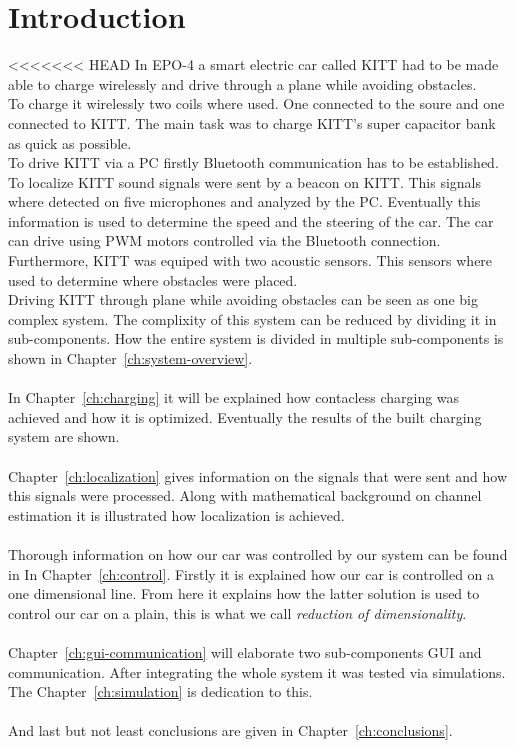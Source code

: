 \documentclass[11pt,titlepage]{report}
\begin{document}
\chapter{Introduction}
<<<<<<< HEAD
In EPO-4 a smart electric car called KITT had to be made able to charge wirelessly and drive through a plane while avoiding obstacles. \\
To charge it wirelessly two coils where used. One connected to the soure and one connected to KITT. The main task was to charge KITT's super capacitor bank as quick as possible. \\
To drive KITT via a PC firstly Bluetooth communication has to be established. To localize KITT sound signals were sent by a beacon on KITT. This signals where detected on five microphones and analyzed by the PC. Eventually this information is used to determine the speed and the steering of the car. The car can drive using PWM motors controlled via the Bluetooth connection. Furthermore, KITT was equiped with two acoustic sensors. This sensors where used to determine where obstacles were placed. \\ 



Driving KITT through plane while avoiding obstacles can be seen as one big complex system. The complixity of this system can be reduced by dividing it in sub-components. How the entire system is divided in multiple sub-components is shown in Chapter~\ref{ch:system-overview}.  \\ \\
 In Chapter~\ref{ch:charging} it will be explained how contacless charging was achieved and how it is optimized. Eventually the results of the built charging system are shown. \\ \\
Chapter~\ref{ch:localization} gives information on the signals that were sent and how this signals were processed. Along with mathematical background on channel estimation it is illustrated how localization is achieved.  \\  \\
Thorough information on how our car was controlled by our system can be found in  In Chapter~\ref{ch:control}. Firstly it is explained how our car is controlled on a one dimensional line. From here it explains how the latter solution is used to control our car on a plain, this is what we call \textit{reduction of dimensionality}. \\  \\
Chapter~\ref{ch:gui-communication} will elaborate two sub-components GUI and communication. After integrating the whole system it was tested via simulations. The Chapter~\ref{ch:simulation} is dedication to this. \\  \\
And last but not least conclusions are given in Chapter~\ref{ch:conclusions}.
\end{document}

